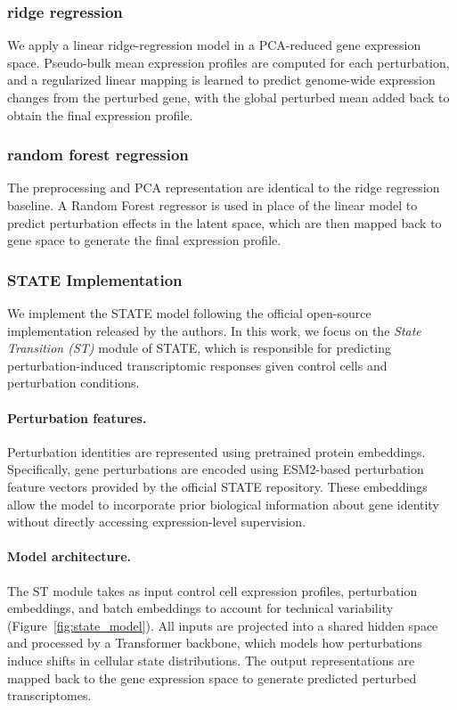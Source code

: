 \documentclass{article}
\begin{document}
\subsubsection{ridge regression}
We apply a linear ridge-regression model in a PCA-reduced gene expression space. Pseudo-bulk mean expression profiles are computed for each perturbation, and a regularized linear mapping is learned to predict genome-wide expression changes from the perturbed gene, with the global perturbed mean added back to obtain the final expression profile.

\subsubsection{random forest regression}
The preprocessing and PCA representation are identical to the ridge regression baseline. 
A Random Forest regressor is used in place of the linear model to predict perturbation effects in the latent space, which are then mapped back to gene space to generate the final expression profile.


\subsubsection{STATE Implementation}

We implement the STATE model following the official open-source implementation released by the authors.
In this work, we focus on the \textit{State Transition (ST)} module of STATE, which is responsible for predicting
perturbation-induced transcriptomic responses given control cells and perturbation conditions.

\paragraph{Perturbation features.}
Perturbation identities are represented using pretrained protein embeddings.
Specifically, gene perturbations are encoded using ESM2-based perturbation feature vectors provided
by the official STATE repository.
These embeddings allow the model to incorporate prior biological information about gene identity
without directly accessing expression-level supervision.

\paragraph{Model architecture.}
The ST module takes as input control cell expression profiles, perturbation embeddings, and batch embeddings
to account for technical variability (Figure~\ref{fig:state_model}).
All inputs are projected into a shared hidden space and processed by a Transformer backbone,
which models how perturbations induce shifts in cellular state distributions.
The output representations are mapped back to the gene expression space to generate predicted
perturbed transcriptomes.
\end{document}
